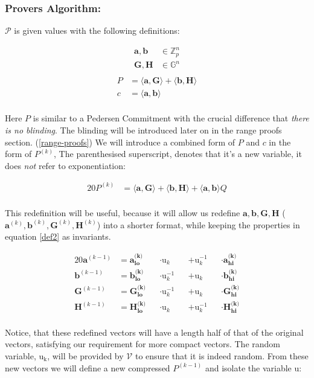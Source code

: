 \documentclass{article}
\newcommand{\eq}[1]{\begin{alignat*}{20}#1\end{alignat*}}
\newcommand{\eqn}[2]{\begin{equation}\label{#1}\begin{split}#2\end{split}\end{equation}}
\renewcommand{\vec}[1]{\boldsymbol{#1}}
\newcommand{\ran}[1]{\mathrm{#1}}
\newcommand{\V}{\mathcal{V}}
\renewcommand{\P}{\mathcal{P}}
\newcommand{\G}{\mathbb{G}}
\newcommand{\Z}{\mathbb{Z}}
\newcommand{\dotp}[2]{\langle #1, #2 \rangle}
\newcommand{\opn}[1]{\operatorname{#1}}
\newcommand{\veclo}[1]{\vec{#1_{\opn{lo}}}}
\newcommand{\vechi}[1]{\vec{#1_{\opn{hi}}}}
\begin{document}
\subsubsection{Provers Algorithm:}
$\P$ is given values with the following definitions:

\eqn{ipp-def1}{
	\vec{a}, \vec{b} &\in \Z^n_p \\
	\vec{G}, \vec{H} &\in \G^n \\
}
\eqn{ipp-def2}{
	P &= \dotp{\vec{a}}{\vec{G}} + \dotp{\vec{b}}{\vec{H}} \\
	c &= \dotp{\vec{a}}{\vec{b}} \\
}

Here $P$ is similar to a Pedersen Commitment with the crucial difference
that \textit{there is no blinding}. The blinding will be introduced
later on in the range proofs section. (\ref{range-proofs}) We will
introduce a combined form of $P$ and $c$ in the form of $P^{(k)}$,
The parenthesised superscript, denotes that it's a new variable,
it does \textit{not} refer to exponentiation:

\eq{
	P^{(k)} &= \dotp{\vec{a}}{\vec{G}} +
	           \dotp{\vec{b}}{\vec{H}} +
	           \dotp{\vec{a}}{\vec{b}}Q \\
} 

This redefinition will be useful, because it will allow us redefine
$\vec{a}, \vec{b}, \vec{G}, \vec{H}$ ($\vec{a}^{(k)}, \vec{b}^{(k)},
\vec{G}^{(k)}, \vec{H}^{(k)}$) into a shorter format, while keeping the
properties in equation \ref{def2} as invariants.

\eq{
	\vec{a}^{(k-1)} &= \veclo{a^{\text{(k)}}} &&\cdot \ran{u}_k      &&+ \ran{u}^{-1}_k &&\cdot \vechi{a^{\text{(k)}}} \\
	\vec{b}^{(k-1)} &= \veclo{b^{\text{(k)}}} &&\cdot \ran{u}^{-1}_k &&+ \ran{u}_k      &&\cdot \vechi{b^{\text{(k)}}} \\
	\vec{G}^{(k-1)} &= \veclo{G^{\text{(k)}}} &&\cdot \ran{u}^{-1}_k &&+ \ran{u}_k      &&\cdot \vechi{G^{\text{(k)}}} \\
	\vec{H}^{(k-1)} &= \veclo{H^{\text{(k)}}} &&\cdot \ran{u}_k      &&+ \ran{u}^{-1}_k &&\cdot \vechi{H^{\text{(k)}}} \\
}

Notice, that these redefined vectors will have a length half of that
of the original vectors, satisfying our requirement for more compact
vectors. The random variable, $\ran{u_k}$, will be provided by $\V$
to ensure that it is indeed random. From these new vectors we will
define a new compressed $P^{(k-1)}$ and isolate the variable $\ran{u}$:
\end{document}
